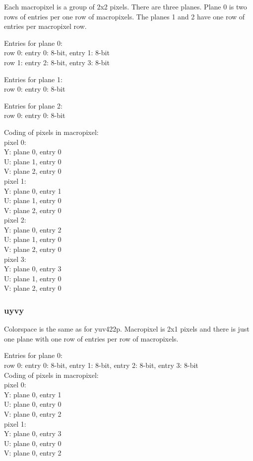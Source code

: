 Each macropixel is a group of 2x2 pixels. There are three planes. Plane 0 is two rows of entries per one row of macropixels. The planes 1 and 2 have one row of entries per macropixel row.

Entries for plane 0: \\
row 0: entry 0: 8-bit, entry 1: 8-bit \\
row 1: entry 2: 8-bit, entry 3: 8-bit

Entries for plane 1: \\
row 0: entry 0: 8-bit

Entries for plane 2: \\
row 0: entry 0: 8-bit

Coding of pixels in macropixel: \\
pixel 0: \\
Y: plane 0, entry 0 \\
U: plane 1, entry 0 \\
V: plane 2, entry 0 \\
pixel 1: \\
Y: plane 0, entry 1 \\
U: plane 1, entry 0 \\
V: plane 2, entry 0 \\
pixel 2: \\
Y: plane 0, entry 2 \\
U: plane 1, entry 0 \\
V: plane 2, entry 0 \\
pixel 3: \\
Y: plane 0, entry 3 \\
U: plane 1, entry 0 \\
V: plane 2, entry 0 \\

\subsubsection{uyvy}

Colorspace is the same as for yuv422p. Macropixel is 2x1 pixels and there is just one plane with one row of entries per row of macropixels. 

Entries for plane 0: \\
row 0: entry 0: 8-bit, entry 1: 8-bit, entry 2: 8-bit, entry 3: 8-bit \\

Coding of pixels in macropixel: \\
pixel 0: \\
Y: plane 0, entry 1 \\
U: plane 0, entry 0 \\
V: plane 0, entry 2 \\
pixel 1: \\
Y: plane 0, entry 3 \\
U: plane 0, entry 0 \\
V: plane 0, entry 2 \\

